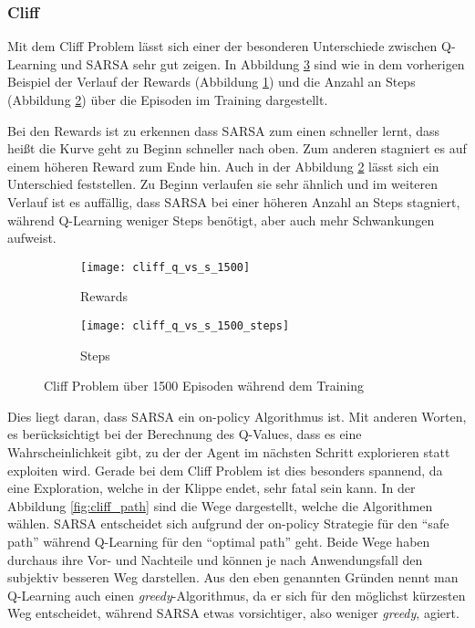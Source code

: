 \subsubsection{Cliff}

Mit dem Cliff Problem lässt sich einer der besonderen Unterschiede zwischen Q-Learning und SARSA sehr gut zeigen. In Abbildung \ref{fig:cliff_train} sind wie in dem vorherigen Beispiel der Verlauf der Rewards (Abbildung \ref{fig:cliff_rew}) und die Anzahl an Steps (Abbildung \ref{fig:cliff_step}) über die Episoden im Training dargestellt.

Bei den Rewards ist zu erkennen dass SARSA zum einen schneller lernt, dass heißt die Kurve geht zu Beginn schneller nach oben. Zum anderen stagniert es auf einem höheren Reward zum Ende hin. Auch in der Abbildung \ref{fig:cliff_step} lässt sich ein Unterschied feststellen. Zu Beginn verlaufen sie sehr ähnlich und im weiteren Verlauf ist es auffällig, dass SARSA bei einer höheren Anzahl an Steps stagniert, während Q-Learning weniger Steps benötigt, aber auch mehr Schwankungen aufweist.




\begin{figure}[H]
    \centering
    \begin{subfigure}{.5\textwidth}
      \centering
      \texttt{[image: cliff\_q\_vs\_s\_1500]}
      \caption{Rewards}
      \label{fig:cliff_rew}
    \end{subfigure}%
    \begin{subfigure}{.5\textwidth}
      \centering
      \texttt{[image: cliff\_q\_vs\_s\_1500\_steps]}
      \caption{Steps}
      \label{fig:cliff_step}
    \end{subfigure}
    \caption{Cliff Problem über 1500 Episoden während dem Training}
    \label{fig:cliff_train}
\end{figure}

Dies liegt daran, dass SARSA ein on-policy Algorithmus ist. Mit anderen Worten, es berücksichtigt bei der Berechnung des Q-Values, dass es eine Wahrscheinlichkeit gibt, zu der der Agent im nächsten Schritt explorieren statt exploiten wird.
Gerade bei dem Cliff Problem ist dies besonders spannend, da eine Exploration, welche in der Klippe endet, sehr fatal sein kann. In der Abbildung \ref{fig:cliff_path} sind die Wege dargestellt, welche die Algorithmen wählen. SARSA entscheidet sich aufgrund der on-policy Strategie für den ``safe path'' während Q-Learning für den ``optimal path'' geht. 
Beide Wege haben durchaus ihre Vor- und Nachteile und können je nach Anwendungsfall den subjektiv besseren Weg darstellen.
Aus den eben genannten Gründen nennt man Q-Learning auch einen \textit{greedy}-Algorithmus, da er sich für den möglichst kürzesten Weg entscheidet, während SARSA etwas vorsichtiger, also weniger \textit{greedy}, agiert.

